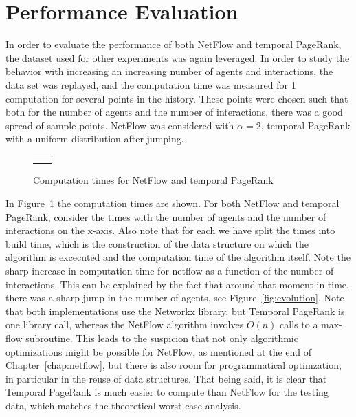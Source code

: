 \documentclass[a4paper,11pt]{book}
\theoremstyle{definition}
\begin{document}
\section{Performance Evaluation}

In order to evaluate the performance of both NetFlow and temporal PageRank, the dataset used for
other experiments was again leveraged. In order to study the behavior with increasing an increasing
number of agents and interactions, the data set was replayed, and the computation time was measured
for 1 computation for several points in the history. These points were chosen such that
both for the number of agents and the number of interactions, there was a good spread of
sample points.
NetFlow was considered with $\alpha=2$, temporal PageRank with a uniform
distribution after jumping. 

\begin{figure}[ht]
    \centering
    \begin{tabular}[ht]{cc}
         &
         \\
         &
         \\

    \end{tabular}
    \caption{Computation times for NetFlow and temporal PageRank}
    \label{fig:performance}
\end{figure}

In Figure~\ref{fig:performance} the computation times are shown. For both NetFlow and temporal PageRank,
consider the times with the number of agents and the number of interactions on the x-axis. Also note
that for each we have split the times into build time, which is the construction of the data structure
on which the algorithm is excecuted and the computation time of the algorithm itself. Note the sharp
increase in computation time for netflow as a function of the number of interactions. This can be
explained by the fact that around that moment in time, there was a sharp jump in the number of agents,
see Figure~\ref{fig:evolution}. Note that both implementations use the Networkx library, but 
Temporal PageRank is one library call, whereas the NetFlow algorithm involves $O(n)$ calls to
a max-flow subroutine. This leads to the suspicion that not only algorithmic optimizations might
be possible for NetFlow, as mentioned at the end of Chapter~\ref{chap:netflow}, but there is also
room for programmatical optimzation, in particular in the reuse of data structures. That
being said, it is clear that Temporal PageRank is much easier to compute than NetFlow for 
the testing data, which matches the theoretical worst-case analysis.
\end{document}
